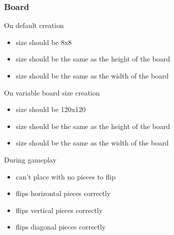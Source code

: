 \documentclass[a4wide, 11pt]{article}
\begin{document}
  \subsubsection{Board}
  \begin{itemize}
    \setlength{\itemsep}{-1mm}
    \begin{item}
      \vspace{-2mm}
      On default creation
      \vspace{-3mm}
      \begin{itemize}
        \setlength{\itemsep}{-1mm}
        \item{size should be 8x8}
        \item{size should be the same as the height of the board}
        \item{size should be the same as the width of the board}
      \end{itemize}
    \end{item}
    \begin{item}
      \vspace{-2mm}
      On variable board size creation
      \vspace{-3mm}
      \begin{itemize}
        \setlength{\itemsep}{-1mm}
        \item{size should be 120x120}
        \item{size should be the same as the height of the board}
        \item{size should be the same as the width of the board}
      \end{itemize}
    \end{item}
    \begin{item}
      \vspace{-2mm}
      During gameplay
      \vspace{-3mm}
      \begin{itemize}
        \setlength{\itemsep}{-1mm}
        \item{can't place with no pieces to flip}
        \item{flips horizontal pieces correctly}
        \item{flips vertical pieces correctly}
        \item{flips diagonal pieces correctly}
      \end{itemize}
    \end{item}
  \end{itemize}
\end{document}
